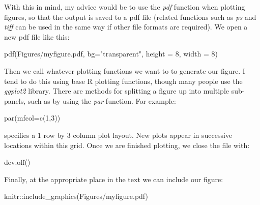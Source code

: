 \documentclass[
]{article}
\newenvironment{Shaded}{\begin{snugshade}}{\end{snugshade}}
\newcommand{\AttributeTok}[1]{\textcolor[rgb]{0.77,0.63,0.00}{#1}}
\newcommand{\DecValTok}[1]{\textcolor[rgb]{0.00,0.00,0.81}{#1}}
\newcommand{\FunctionTok}[1]{\textcolor[rgb]{0.00,0.00,0.00}{#1}}
\newcommand{\NormalTok}[1]{#1}
\newcommand{\SpecialCharTok}[1]{\textcolor[rgb]{0.00,0.00,0.00}{#1}}
\newcommand{\StringTok}[1]{\textcolor[rgb]{0.31,0.60,0.02}{#1}}
\begin{document}
With this in mind, my advice would be to use the \emph{pdf} function when plotting figures, so that the output is saved to a pdf file (related functions such as \emph{ps} and \emph{tiff} can be used in the same way if other file formats are required). We open a new pdf file like this:

\begin{Shaded}
\begin{Highlighting}[]
\FunctionTok{pdf}\NormalTok{(}\StringTok{\textquotesingle{}Figures/myfigure.pdf\textquotesingle{}}\NormalTok{, }\AttributeTok{bg=}\StringTok{"transparent"}\NormalTok{, }\AttributeTok{height =} \DecValTok{8}\NormalTok{, }\AttributeTok{width =} \DecValTok{8}\NormalTok{)}
\end{Highlighting}
\end{Shaded}

Then we call whatever plotting functions we want to to generate our figure. I tend to do this using base R plotting functions, though many people use the \emph{ggplot2} library. There are methods for splitting a figure up into multiple sub-panels, such as by using the \emph{par} function. For example:

\begin{Shaded}
\begin{Highlighting}[]
\FunctionTok{par}\NormalTok{(}\AttributeTok{mfcol=}\FunctionTok{c}\NormalTok{(}\DecValTok{1}\NormalTok{,}\DecValTok{3}\NormalTok{))}
\end{Highlighting}
\end{Shaded}

specifies a 1 row by 3 column plot layout. New plots appear in successive locations within this grid. Once we are finished plotting, we close the file with:

\begin{Shaded}
\begin{Highlighting}[]
\FunctionTok{dev.off}\NormalTok{()}
\end{Highlighting}
\end{Shaded}

Finally, at the appropriate place in the text we can include our figure:

\begin{Shaded}
\begin{Highlighting}[]
\NormalTok{knitr}\SpecialCharTok{::}\FunctionTok{include\_graphics}\NormalTok{(}\StringTok{\textquotesingle{}Figures/myfigure.pdf\textquotesingle{}}\NormalTok{)}
\end{Highlighting}
\end{Shaded}
\end{document}

